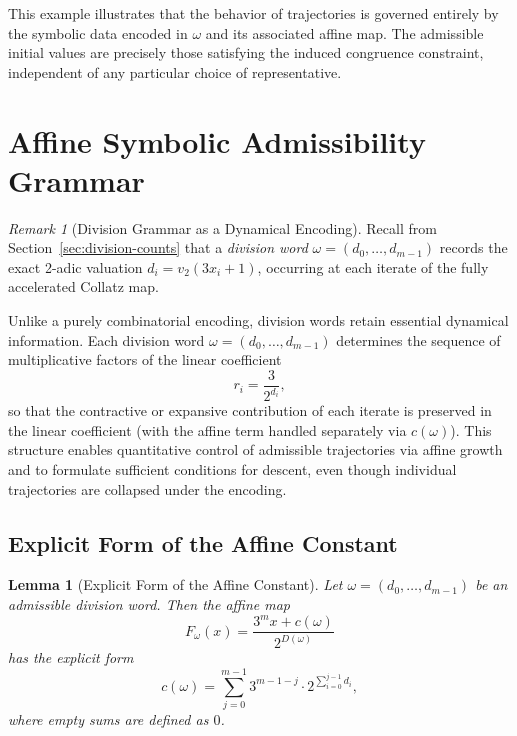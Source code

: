 \documentclass[12pt, oneside]{article}
\numberwithin{equation}{section}
\theoremstyle{definition}
\theoremstyle{plain}
\newtheorem{lemma}[theorem]{Lemma}
\theoremstyle{remark}
\newtheorem*{remark}{Remark}
\begin{document}
\medskip

This example illustrates that the behavior of trajectories is governed
entirely by the symbolic data encoded in $\omega$ and its associated
affine map. The admissible initial values are precisely those satisfying
the induced congruence constraint, independent of any particular choice
of representative.

\section{Affine Symbolic Admissibility Grammar}

\begin{remark}[Division Grammar as a Dynamical Encoding]
Recall from Section~\ref{sec:division-counts} that a \emph{division word}
$\omega=(d_0,\dots,d_{m-1})$ records the exact 2-adic valuation
$d_i = v_2(3 x_i + 1)$, occurring at each iterate of the fully accelerated
Collatz map.


Unlike a purely combinatorial encoding, division words retain essential
dynamical information. Each division word $\omega=(d_0,\dots,d_{m-1})$
determines the sequence of multiplicative factors of the linear coefficient
\[
r_i = \frac{3}{2^{d_i}},
\]
so that the contractive or expansive contribution of each iterate is
preserved in the linear coefficient (with the affine term handled separately
via $c(\omega)$). This structure enables quantitative control of admissible
trajectories via affine growth and to formulate sufficient conditions for
descent, even though individual trajectories are collapsed under the encoding.
\end{remark}

\subsection{Explicit Form of the Affine Constant}
\begin{lemma}[Explicit Form of the Affine Constant]
Let $\omega = (d_0,\dots,d_{m-1})$ be an admissible division word.  
Then the affine map
\[
F_\omega(x) = \frac{3^m x + c(\omega)}{2^{D(\omega)}}
\]
has the explicit form
\[
c(\omega)
=
\sum_{j=0}^{m-1}
3^{m-1-j}\cdot 2^{\sum_{i=0}^{j-1} d_i},
\]
where empty sums are defined as $0$.
\end{lemma}
\end{document}
